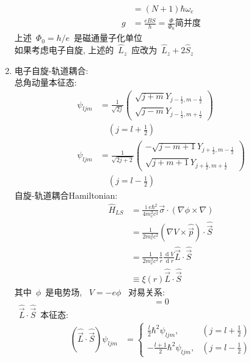 \documentclass[11pt,a4paper,twocolumn,fleqn]{article}%
\DeclareMathOperator{\dif}{d}
\DeclareMathOperator{\mi}{i}
\renewcommand{\[}{~$}
\renewcommand{\]}{$~}%
\begin{document}
\begin{enumerate}
\begin{align}
  	 &= (N+1)\hbar\omega_{\mathrm c} \\
  	 g &= \frac{eBS}{h} = \frac{\Phi}{\Phi_0} \mbox{简并度}
  	\end{align}
  	上述\[\Phi_0 = h/e\]是磁通量子化单位\\
  	如果考虑电子自旋, 上述的\[\hat L_z\]应改为\[\hat L_z + 2\hat S_z\]
  \item 电子自旋-轨道耦合:\\
  	总角动量本征态:
  	\begin{align}
  	 \psi_{ljm} &= \frac{1}{\sqrt{2j}}\begin{pmatrix} \sqrt{j+m}Y_{j-\frac 12,m-\frac 12} \\ \sqrt{j-m}Y_{j-\frac 12,m+\frac 12}\end{pmatrix}\nonumber \\ &\quad \left(j=l+\frac 12\right) \\
  	 \psi_{ljm} &= \frac{1}{\sqrt{2j+2}}\begin{pmatrix} -\sqrt{j-m+1}Y_{j+\frac 12,m-\frac 12} \\ \sqrt{j+m+1}Y_{j+\frac 12,m+\frac 12}\end{pmatrix}\nonumber \\ &\quad \left(j=l-\frac 12\right)
  	\end{align}
  	自旋-轨道耦合Hamiltonian:
  	\begin{align}
  	 \hat H_{LS} &= \frac{\mi e\hbar^2}{4m_e^2c^2}\vec\sigma\cdot\left(\nabla\phi\times\nabla\right) \\
  	 &= \frac{1}{2m_e^2c^2}(\nabla V\times\hat{\vec p})\cdot\hat{\vec S} \\
  	 &= \frac{1}{2m_e^2c^2}\frac{1}{r}\frac{\dif V}{\dif r}\hat{\vec L}\cdot\hat{\vec S} \\
  	 &\equiv \xi(r)\hat{\vec L}\cdot\hat{\vec S}
  	\end{align}
  	其中\[\phi\]是电势场, \[V = -e\phi\]
  	对易关系: 
  	\begin{equation}
  	 [\hat{\vec L} + \hat{\vec S},\hat{\vec L}\cdot\hat{\vec S}]=0
  	\end{equation}
  	\[\hat{\vec L}\cdot\hat{\vec S}\]本征态:
  	\begin{align}
  	 (\hat{\vec L}\cdot\hat{\vec S})\psi_{ljm} &= \left\{ \begin{array}{ll}
  	 	\frac{l}{2}\hbar^2\psi_{ljm},&\left( j = l + \frac 12 \right) \\
  	 	-\frac{l+1}{2}\hbar^2\psi_{ljm},&\left( j = l - \frac 12 \right)
  	 \end{array}\right.

\end{align}
\end{enumerate}
\end{document}
